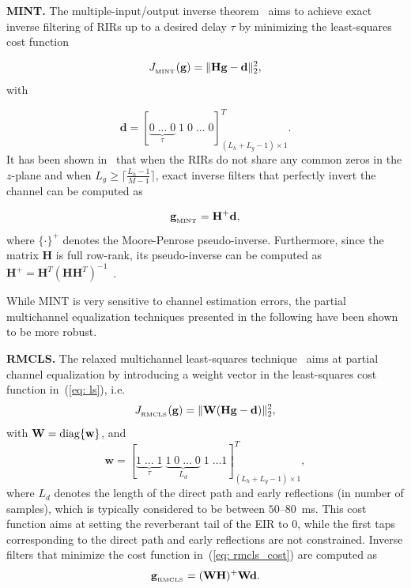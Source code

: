 \documentclass{article}
\begin{document}
\smallskip \noindent \textbf{MINT.} \enspace The multiple-input/output inverse theorem~\cite{Miyoshi_ITASS_1988} aims to achieve exact inverse filtering of RIRs up to a desired delay $\tau$ by minimizing the least-squares cost function

\begin{equation}
\label{eq: ls}
J_{{}_{\rm MINT}}(\mathbf{g}) = \|\mathbf{H}\mathbf{g} - \mathbf{d}\|_2^2, 
\end{equation}
with 

\begin{equation}
  \mathbf{d} = [\underbrace{0 \; \ldots \; 0}_{\tau} \; 1 \; 0 \; \ldots \; 0 ]_{(L_h+L_g-1) \times 1}^T.
\end{equation}
It has been shown in~\cite{Miyoshi_ITASS_1988} that when the RIRs do not share any common zeros in the $z$-plane and when $L_g \geq \lceil{\frac{L_h-1}{M-1}\rceil}$, exact inverse filters that perfectly invert the channel can be computed as

\begin{equation}
  \label{eq: mint}
  \mathbf{g}_{{}_{\rm MINT}} = \mathbf{H}^+\mathbf{d},
\end{equation}
where $\{\cdot\}^+$ denotes the Moore-Penrose pseudo-inverse. 
Furthermore, since the matrix $\mathbf{H}$ is full row-rank, its pseudo-inverse can be computed as $\mathbf{H}^+ = \mathbf{H}^T(\mathbf{H}\mathbf{H}^T)^{-1}$~\cite{Harikumar_ITSP_1998}.

While MINT is very sensitive to channel estimation errors, the partial multichannel equalization techniques presented in the following have been shown to be more robust.

\smallskip \noindent \textbf{RMCLS.} \enspace The relaxed multichannel least-squares technique~\cite{Zhang_IWAENC_2010} aims at partial channel equalization by introducing a weight vector in the least-squares cost function in~(\ref{eq: ls}), i.e.
\begin{equation}
\label{eq: rmcls_cost}
J_{{}_{\rm RMCLS}}(\mathbf{g}) = \|\mathbf{W}({\mathbf{H}}\mathbf{g} - \mathbf{d})\|_2^2,
\end{equation}
with $\mathbf{W} = {\rm diag}\{\mathbf{w}\}$, and
\begin{equation}
\mathbf{w} = [\underbrace{1 \; \ldots \; 1}_{\tau} \; \underbrace{1 \; 0 \; \ldots \; 0}_{L_d} \; 1 \; \ldots 1]_{(L_h+L_g-1) \times 1}^{T},
\end{equation}
where $L_d$ denotes the length of the direct path and early reflections (in number of samples), which is typically considered to be between $50$--$80$~ms. This cost function aims at setting the reverberant tail of the EIR to $0$, while the first taps corresponding to the direct path and early reflections are not constrained.
Inverse filters that minimize the cost function in~(\ref{eq: rmcls_cost}) are computed as
\begin{equation}
\mathbf{g}_{{}_{\rm RMCLS}}= (\mathbf{W}{\mathbf{H}})^{+}\mathbf{W}\mathbf{d}.
\end{equation}
\end{document}
